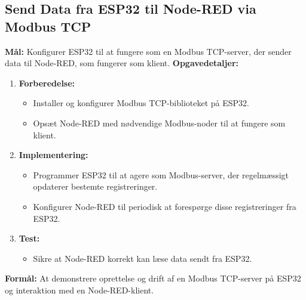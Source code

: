 \subsection*{Send Data fra ESP32 til Node-RED via Modbus TCP}
\textbf{Mål:} Konfigurer ESP32 til at fungere som en Modbus TCP-server, der sender data til Node-RED, som fungerer som klient.
\newline\newline\noindent
\textbf{Opgavedetaljer:}
\begin{enumerate}
	\item \textbf{Forberedelse:}
	\begin{itemize}
		\item Installer og konfigurer Modbus TCP-biblioteket på ESP32.
		\item Opsæt Node-RED med nødvendige Modbus-noder til at fungere som klient.
	\end{itemize}
	\item \textbf{Implementering:}
	\begin{itemize}
		\item Programmer ESP32 til at agere som Modbus-server, der regelmæssigt opdaterer bestemte registreringer.
		\item Konfigurer Node-RED til periodisk at forespørge disse registreringer fra ESP32.
	\end{itemize}
	\item \textbf{Test:}
	\begin{itemize}
		\item Sikre at Node-RED korrekt kan læse data sendt fra ESP32.
	\end{itemize}
\end{enumerate}
\textbf{Formål:} At demonstrere oprettelse og drift af en Modbus TCP-server på ESP32 og interaktion med en Node-RED-klient.

